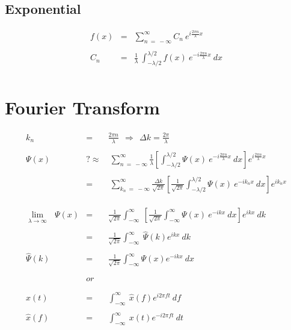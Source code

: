 \documentclass[12pt]{article}
\begin{document}
\subsection{Exponential}
	\begin{eqnarray*}
		f(x) &=& \displaystyle\sum\limits_{n \ = \ -\infty}^{\infty} C_n \ e^{i \frac{2 \pi n}{\lambda}x} \\ \\
		C_n &=& \frac{1}{\lambda} \ \int_{-\lambda/2}^{\lambda/2} f(x) \ e^{-i \frac{2\pi n}{\lambda} x} \ dx \\
	\end{eqnarray*}

\section{Fourier Transform}
\begin{eqnarray*}
	k_n &=& \frac{2\pi n}{\lambda} \ \ \Rightarrow \ \ \Delta k = \frac{2\pi}{\lambda} \\ \\
	\Psi(x) &?\approx&\ \displaystyle\sum \limits_{n \ = \ -\infty}^{\infty} \frac{1}{\lambda} \left[ \int_{-\lambda/2}^{\lambda/2} \Psi(x) \ e^{-i \frac{2\pi n}{\lambda} x} \ dx \right] e^{i \frac{2 \pi n}{\lambda} x} \\ \\
	&=&\ \displaystyle\sum \limits_{k_n \ = \ -\infty}^{\infty} \frac{\Delta k}{\sqrt{2\pi}} \left[ \frac{1}{\sqrt{2\pi}} \int_{-\lambda/2}^{\lambda/2} \Psi(x) \ e^{-i k_n x} \ dx \right] e^{i k_n x} \\ \\ \\ \\
	\lim_{\lambda \rightarrow \infty} \ \ \ \Psi(x) &=& \frac{1}{\sqrt{2\pi}} \int_{-\infty}^{\infty} \ \left[ \frac{1}{\sqrt{2\pi}} \int_{-\infty}^{\infty} \Psi(x) \ e^{-i k x} \ dx \right] e^{i k x} \ dk \\ \\
	&=& \frac{1}{\sqrt{2\pi}} \int_{-\infty}^{\infty} \ \hat{\Psi}(k) e^{i k x} \ dk \\ \\
	\hat{\Psi}(k) &=& \frac{1}{\sqrt{2\pi}} \int_{-\infty}^{\infty} \Psi(x) e^{-i k x} \ dx \\ \\ \\
	&or& \\ \\ \\
	x(t) &=& \int_{-\infty}^{\infty} \ \hat{x}(f) e^{i 2\pi f t} \ df \\ \\
	\hat{x}(f) &=& \int_{-\infty}^{\infty} \ x(t) e^{-i 2\pi f t} \ dt \\ \\
\end{eqnarray*}
\end{document}
